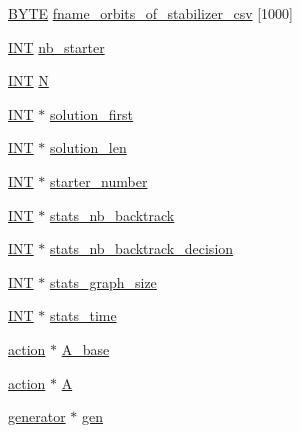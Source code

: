 \begin{DoxyCompactItemize}
\mbox{\hyperlink{galois_8h_ab6cc7b4aeb6ea31aba2b3fbfc83ff5e6}{B\+Y\+TE}} \mbox{\hyperlink{classisomorph_a579c5131f3e9ae498cfbced7e46a8301}{fname\+\_\+orbits\+\_\+of\+\_\+stabilizer\+\_\+csv}} \mbox{[}1000\mbox{]}
\item 
\mbox{\hyperlink{galois_8h_a09fddde158a3a20bd2dcadb609de11dc}{I\+NT}} \mbox{\hyperlink{classisomorph_a0181df006962062494c282bcaff3d247}{nb\+\_\+starter}}
\item 
\mbox{\hyperlink{galois_8h_a09fddde158a3a20bd2dcadb609de11dc}{I\+NT}} \mbox{\hyperlink{classisomorph_a3f60b0c078773a7bf7e0217352cac943}{N}}
\item 
\mbox{\hyperlink{galois_8h_a09fddde158a3a20bd2dcadb609de11dc}{I\+NT}} $\ast$ \mbox{\hyperlink{classisomorph_a6f3dda5ae7e876cd6f64d3a2fd3e40fc}{solution\+\_\+first}}
\item 
\mbox{\hyperlink{galois_8h_a09fddde158a3a20bd2dcadb609de11dc}{I\+NT}} $\ast$ \mbox{\hyperlink{classisomorph_a353e3aaddd72fb522a0b8a875a46d3f6}{solution\+\_\+len}}
\item 
\mbox{\hyperlink{galois_8h_a09fddde158a3a20bd2dcadb609de11dc}{I\+NT}} $\ast$ \mbox{\hyperlink{classisomorph_a1bb112c8a720b785c3ff7f5c82210ec1}{starter\+\_\+number}}
\item 
\mbox{\hyperlink{galois_8h_a09fddde158a3a20bd2dcadb609de11dc}{I\+NT}} $\ast$ \mbox{\hyperlink{classisomorph_ae81608e8d6ef13d1b12e2865463227b4}{stats\+\_\+nb\+\_\+backtrack}}
\item 
\mbox{\hyperlink{galois_8h_a09fddde158a3a20bd2dcadb609de11dc}{I\+NT}} $\ast$ \mbox{\hyperlink{classisomorph_a82474fb98953fbbf2768958d83e2303f}{stats\+\_\+nb\+\_\+backtrack\+\_\+decision}}
\item 
\mbox{\hyperlink{galois_8h_a09fddde158a3a20bd2dcadb609de11dc}{I\+NT}} $\ast$ \mbox{\hyperlink{classisomorph_a2009901595093936f997bace13ecec3b}{stats\+\_\+graph\+\_\+size}}
\item 
\mbox{\hyperlink{galois_8h_a09fddde158a3a20bd2dcadb609de11dc}{I\+NT}} $\ast$ \mbox{\hyperlink{classisomorph_a67eee074130cefa2b30717399ad2b553}{stats\+\_\+time}}
\item 
\mbox{\hyperlink{classaction}{action}} $\ast$ \mbox{\hyperlink{classisomorph_a045c434453d3a159aeeedbed33d23b5e}{A\+\_\+base}}
\item 
\mbox{\hyperlink{classaction}{action}} $\ast$ \mbox{\hyperlink{classisomorph_a396591abf9126903999a0df60ac1e398}{A}}
\item 
\mbox{\hyperlink{classgenerator}{generator}} $\ast$ \mbox{\hyperlink{classisomorph_afb02cf301a3151bac0153761b5aefe85}{gen}}

\end{DoxyCompactItemize}

